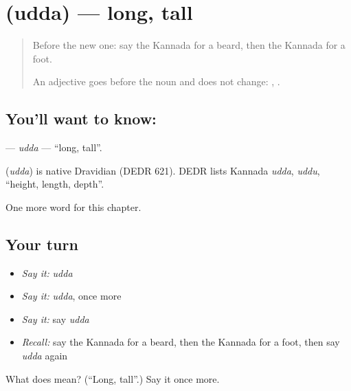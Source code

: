 \section[\texorpdfstring{\kn{ಉದ್ದ} (udda)}{ಉದ್ದ (udda)}]{ (udda) — long, tall}

\label{lesson:KA-C140-udda}



\begin{quote}
Before the new one: say the Kannada for a beard, then the Kannada for a foot.

An adjective goes before the noun and does not change: \textbf{ }, \textbf{ }.
\end{quote}

\subsection*{You'll want to know: }
\textbf{} — \emph{udda} — \textquotedblleft{}long, tall\textquotedblright{}.

\begin{cousinweb}
\textbf{} (\emph{udda}) is native Dravidian (DEDR 621). DEDR lists Kannada \emph{udda}, \emph{uddu}, \textquotedblleft{}height, length, depth\textquotedblright{}.
\end{cousinweb}

\begin{grammarlens}[title={What you've built}]
One more word for this chapter.
\end{grammarlens}

\subsection*{Your turn}
\begin{itemize}
\raggedright
  \item \emph{Say it:} \emph{udda}
  \item \emph{Say it:} \emph{udda}, once more
  \item \emph{Say it:} say \emph{udda}
  \item \emph{Recall:} say the Kannada for a beard, then the Kannada for a foot, then say \emph{udda} again
\end{itemize}

\begin{tcolorbox}[breakable,colback=teal!4,colframe=teal!35!black,title={Before you move on}]
What does  mean? (\textquotedblleft{}Long, tall\textquotedblright{}.) Say it once more.
\end{tcolorbox}
